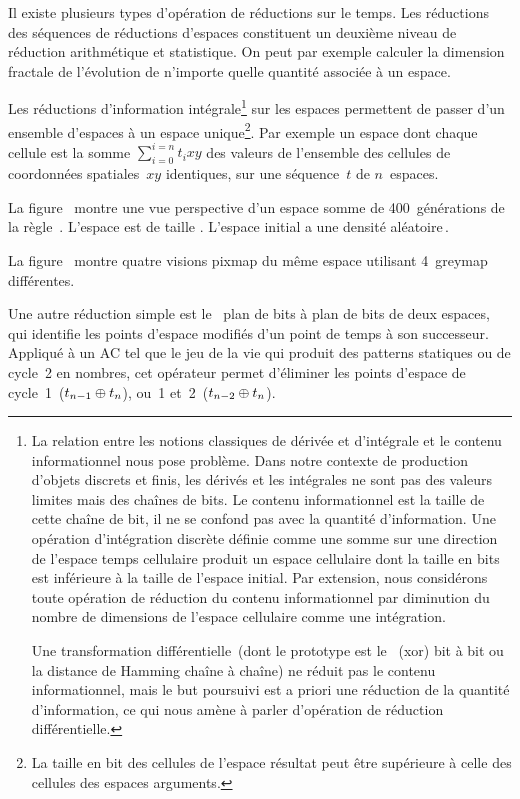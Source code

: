 Il existe plusieurs types d'op\'eration de r\'eductions sur le temps. %
Les r\'eductions des s\'equences de r\'eductions d'espaces constituent un
deuxi\`eme niveau de r\'eduction arithm\'etique et statistique. %
On peut par exemple calculer la dimension fractale de l'\'evolution de
n'importe quelle quantit\'e associ\'ee \`a un espace. %

Les r\'eductions d'information int\'egrale\footnote{%
  La relation entre les notions classiques de d\'eriv\'ee et d'int\'egrale et
  le contenu informationnel nous pose probl\`eme. %
  Dans notre contexte de production d'objets discrets et finis, %
  les d\'eriv\'es et les int\'egrales ne sont pas des valeurs limites
  mais des cha\^ines de bits. %
  Le contenu informationnel est la taille de cette cha\^ine de bit, il
  ne se confond pas avec la quantit\'e d'information. %
  Une op\'eration d'int\'egration discr\`ete d\'efinie comme une somme sur une
  direction de l'espace temps cellulaire produit un espace cellulaire
  dont la taille en bits est inf\'erieure \`a la taille de l'espace
  initial. %
  Par extension, nous consid\'erons toute op\'eration de r\'eduction du
  contenu informationnel par diminution du nombre de dimensions de
  l'espace cellulaire comme une int\'egration. %
  
  Une transformation diff\'erentielle~(dont le prototype est le \xor~(xor) bit
  \`a bit ou la distance de Hamming cha\^ine \`a cha\^ine) ne r\'eduit pas le
  contenu informationnel, mais le but poursuivi est a priori une
  r\'eduction de la quantit\'e d'information, ce qui nous am\`ene \`a parler
  d'op\'eration de r\'eduction diff\'erentielle.}%
sur les espaces permettent de passer d'un ensemble d'espaces \`a un
espace unique\footnote{%
  La taille en bit des cellules de l'espace r\'esultat peut \^etre
  sup\'erieure \`a celle des cellules des espaces arguments.}. %
Par exemple un espace dont chaque cellule est la somme
$\sum_{i=0}^{i=n}t_{i}xy$ des valeurs de l'ensemble des cellules de
coordonn\'ees spatiales~$xy$ identiques, sur une s\'equence~$t$ de $n$~espaces. %

\noindent%
La figure~ montre une vue perspective d'un
espace somme de 400~g\'en\'e\-rations de la r\`egle~. %
L'espace est de taille . %
L'espace initial a une densit\'e al\'eatoire\,\undemi. %

\noindent%
La figure~ montre quatre visions pixmap
du m\^eme espace utilisant 4~greymap diff\'erentes. %

Une autre r\'eduction simple est le \xor\ plan de bits \`a plan de bits de
deux espaces, qui identifie les points d'espace modifi\'es d'un point de
temps \`a son successeur. %
Appliqu\'e \`a un AC tel que le jeu de la vie qui produit des patterns
statiques ou de cycle~2 en nombres, cet
op\'erateur permet d'\'eliminer les points d'espace %
de cycle~1~($t_{n-1} \oplus t_{n}$),
ou~1 et~2~($t_{n-2} \oplus t_{n}$). %

